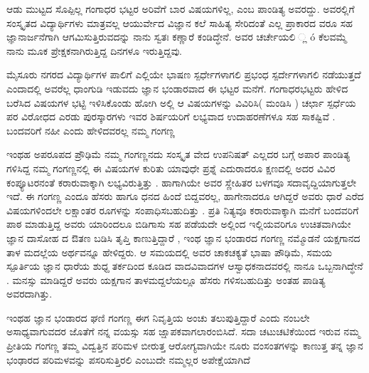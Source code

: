ಆಡು ಮುಟ್ಟದ ಸೊಪ್ಪಿಲ್ಲ ಗಂಗಾಧರ ಭಟ್ಟರ ಅರಿವೆಗೆ ಬಾರ ವಿಷಯಗಳಿಲ್ಲ, ಎಂಬ ಪಾಂಡಿತ್ಯ ಅವರದ್ದು.  ಅವರಲ್ಲಿಗೆ ಸಂಸ್ಕೃತದ ವಿದ್ಯಾರ್ಥಿಗಳು ಮಾತ್ರವಲ್ಲ  ಆಯುರ್ವೇದ ವಿಜ್ಞಾನ ಕಲೆ ಸಾಹಿತ್ಯ ಸೇರಿದಂತೆ  ಎಲ್ಲ ಪ್ರಾಕಾರದ ವರೂ ಸಹ ಜ್ಞಾನಾರ್ಜನೆಗಾಗಿ ಆಗಮಿಸುತ್ತಿರುವದನ್ನು ನಾನು ಸ್ವತಃ ಕಣ್ಣಾರೆ  ಕಂಡಿದ್ಧೇನೆ. ಅವರ ಚರ್ಚೇಯಲಿ ್ಲ ó ಕೆಲವಮ್ಮೆ ನಾನು  ಮೂಕ ಪ್ರೇಕ್ಷಕನಾಗಿರುತ್ತಿದ್ದ ದಿನಗಳೂ ಇರುತ್ತಿದ್ದವು.

ಮೈಸೂರು ನಗರದ ವಿದ್ಯಾರ್ಥಿಗಳ ಪಾಲಿಗೆ ಎಲ್ಲಿಯೇ ಭಾಷಣ ಸ್ಪರ್ಧೇಗಳಾಗಲಿ  ಪ್ರಭಂಧ ಸ್ಪರ್ದೇಗಳಾಗಲಿ  ನಡೆಯುತ್ತದೆ ಎಂದಾದಲ್ಲಿ   ಅವರೆಲ್ಲ ಧಾಂಗುಡಿ ಇಡುವದು ಜ್ಞಾನ ಭಂಡಾರವಾದ ಈ ಭಟ್ಟರ ಮನೆಗೆ.  ಗಂಗಾಧರಭಟ್ಟರು ಹೇಳಿದ  ಬರೆಸಿದ ವಿಷಯಗಳ ಭಟ್ಟಿ ಇಳಿಸಿಕೊಂಡು ಹೋಗಿ   ಅಲ್ಲಿ ಆ ವಿಷಯಗಳನ್ನು ವಿವಿರಿಸಿ( ಮಂಡಿಸಿ )   ಚರ್ಛಾ ಸ್ಪರ್ಧೆಯ ಪರ ವಿರೋಧದ ಎರಡು ಪುರಸ್ಕಾರಗಳು ಇವರ ಶಿರ್ಷಯರಿಗೆ ಲಭ್ಯವಾದ ಉದಾಹರಣೆಗಳೂ ಸಹ ಸಾಕಷ್ಟಿವೆ . ಬಂದವರಿಗೆ ನಹೀ ಎಂದು ಹೇಳಿದವರಲ್ಲ ನಮ್ಮ ಗಂಗಣ್ಣ  

ಇಂಥಹ ಅಪರೂಪದ ಪ್ರೌಢಿಮೆ ನಮ್ಮ ಗಂಗಣ್ಣನದು  ಸಂಸ್ಕೃತ ವೇದ ಉಪನಿಷತ್ ಎಲ್ಲದರ ಬಗ್ಗೆ ಅಪಾರ ಪಾಂಡಿತ್ಯ ಗಳಿಸಿದ್ದ ನಮ್ಮ ಗಂಗಣ್ಣನಲ್ಲಿ ಈ ವಿಷಯಗಳ ಕುರಿತು ಯಾವುಧೇ ಪ್ರಶ್ನೆ ಎದುರಾದರೂ ಕ್ಷಣದಲ್ಲಿ ಅದರ ವಿವಿರ ಕಂಪ್ಯೂಟರನಂತೆ ಕರಾರುವಾಕ್ಕಾಗಿ ಲಭ್ಯವಿರುತ್ತಿತ್ತು . ಹಾಗಾಗಿಯೇ ಅವರ ಸ್ಣೇಹಿತರ ಬಳಗವೂ ಸದಾವೃದ್ದಿಯಾಗುತ್ತಲೇ ಇದೆ.  ಈ ಗಂಗಣ್ಣ ಎಂದೂ ಹೆಸರು ಹಾಗೂ ಧನದ ಹಿಂದೆ ಬಿದ್ದವರಲ್ಲ, ಹಾಗೇನಾದರೂ ಆಗಿದ್ದರೆ ಅವರು ಧಾರೆ ಎರೆದ  ವಿಷಯಗಳಿಂದಲೇ  ಲಕ್ಷಾಂತರ ರೂಗಳನ್ನು ಸಂಪಾಧಿಸಬಹುದಿತ್ತು . ಪ್ರತಿ ನಿತ್ಯವೂ ಕರಾರುವಾಕ್ಕಾಗಿ ಮನೆಗೆ ಬಂದವರಿಗೆ ಪಾಠ ಮಾಡುತ್ತಿದ್ದ ಅವರು ಯಾರಿಂದಲೂ ಬಿಡಿಗಾಸು ಸಹ ಪಡೆಯದೇ ಅಲ್ಲಿಂದ ಇಲ್ಲಿಯವರಿಗೂ ಉಚಿತವಾಗಿಯೇ ಜ್ಞಾನ ದಾಸೋಹ ದ ಔತಣ  ಬಡಿಸಿ ತೃಪ್ತಿ ಕಾಣುತ್ತಿದ್ದಾರೆ ,    ಇಂಥ ಜ್ಞಾನ ಭಂಡಾರದ ಗಂಗಣ್ಣ  ನಮ್ಮೊಡನೆ ಯಕ್ಷಗಾನದ ತಾಳ ಮದಲ್ಲೆಯ ಅರ್ಥವನ್ನೂ ಹೇಳಿದ್ದರು.  ಆ ಸಮಯದಲ್ಲಿ ಅವರ ಚಾಕಚಕ್ಯತೆ ಭಾಷಾ ಪೌಢಿಮೆ, ಸಮಯ ಸ್ಪೂರ್ತಿಯ ಜ್ಞಾನ ಧಾರೆಯ ಶುಧ್ದ ತರ್ಕದಿಂದ ಕೂಡಿದ  ವಾದವಿವಾದಗಳ ಆಸ್ವಾಧಕನಾದವರಲ್ಲಿ ನಾನೂ ಒಬ್ಬನಾಗಿದ್ಧೇನೆ . ಮನಸ್ಸು ಮಾಡಿದ್ದರೆ ಅವರು ಯಕ್ಷಗಾನ ತಾಳಮದ್ದಲೆಯಲ್ಲೂ ಹೆಸರು ಗಳಿಸಬಹುದಿತ್ತು ಅಂತಹ ಪಾಡಿತ್ಯ ಅವರದಾಗಿತ್ತು.  

ಇಂಥಹ ಜ್ಞಾನ ಭಂಡಾರದ ಘಣಿ ಗಂಗಣ್ಣ ಈಗ ನಿವೃತ್ತಿಯ ಅಂಚು ತಲುಪುತ್ತಿದ್ದಾರೆ ಎಂದು ನಂಬಲೇ ಅಸಾಧ್ಯವಾಗುವದರ ಜೊತೆಗೆ ನನ್ನ ವಯಸ್ಸು  ಸಹ ಜ್ಷಾಪಕವಾಗಲಾರಂಬಿಸಿದೆ. ಸದಾ ಚಟುಚಟಿಕೆಯಿಂದ ಇರುವ ನಮ್ಮ ಪ್ರೀತಿಯ ಗಂಗಣ್ಣ    ತಮ್ಮ ವಿದ್ವತ್ತಿನ ಪರಿಮಳ ಬೀರುತ್ತ  ಆರೋಗ್ಯವಾಗಿಯೇ  ನೂರು ವಂಸಂತಗಳನ್ನು  ಕಾಣುತ್ತ  ತನ್ನ ಜ್ಞಾನ ಭಂಢಾರದ ಪರಿಮಳವನ್ನು ಪಸರಿಸುತ್ತಿರಲಿ ಎಂಬುದೇ ನಮ್ಮಲ್ಲರ ಅಪೇಕ್ಷೆಯಾಗಿದೆ




